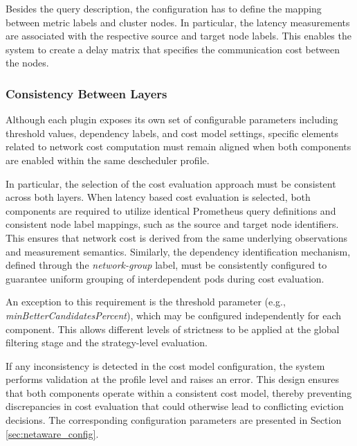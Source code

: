 Besides the query description, the configuration has to define the mapping between metric labels and cluster nodes. In particular, the latency measurements are associated with the respective source and target node labels. This enables the system to create a delay matrix that specifies the communication cost between the nodes.

\subsubsection{Consistency Between Layers}
\label{sec:netaware_costmodelconsistency}
Although each plugin exposes its own set of configurable parameters including threshold values, dependency labels, and cost model settings, specific elements related to network cost computation must remain aligned when both components are enabled within the same descheduler profile.

In particular, the selection of the cost evaluation approach must be consistent across both layers. When latency based cost evaluation is selected, both components are required to utilize identical Prometheus query definitions and consistent node label mappings, such as the source and target node identifiers. This ensures that network cost is derived from the same underlying observations and measurement semantics. Similarly, the dependency identification mechanism, defined through the \textit{network-group} label, must be consistently configured to guarantee uniform grouping of interdependent pods during cost evaluation.

An exception to this requirement is the threshold parameter (e.g., \textit{minBetterCandidatesPercent}), which may be configured independently for each component. This allows different levels of strictness to be applied at the global filtering stage and the strategy-level evaluation.

If any inconsistency is detected in the cost model configuration, the system performs validation at the profile level and raises an error. This design ensures that both components operate within a consistent cost model, thereby preventing discrepancies in cost evaluation that could otherwise lead to conflicting eviction decisions. The corresponding configuration parameters are presented in Section \ref{sec:netaware_config}.



